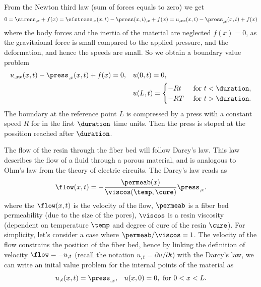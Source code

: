 \documentclass[twoside,a4paper,12pt]{article}
\begin{document}
From the Newton third law (sum of forces equals to zero) we get
%
\begin{align}
  0 =
  \stress_{,x} + f(x) =
  \efstress_{,x}(x,t) - \press(x,t)_{,x} + f(x) =
  u_{,xx}(x,t) - \press_{,x}(x,t) + f(x) 
\end{align}
%
where the body forces and the inertia of the material are neglected
$f(x) = 0$, as the gravitaional force is small compared to the applied
pressure, and the deformation, and hence the speeds are small.
%
So we obtain a boundary value problem
%
\begin{align}
  u_{,xx}(x,t) - \press_{,x}(x,t) + f(x) \label{eq:bvp-flow}
  = 0 , &&& u(0,t) = 0,\\\nonumber
        &&&u(L,t) =
            \begin{cases}
              -Rt &\text{ for } t < \duration,\\
              -RT &\text{ for } t > \duration.
            \end{cases} 
\end{align}
%
The boundary at the reference point $L$ is compressed by a press with
a constant speed $R$ for in the first $\duration$ time units. Then the press
is stoped at the possition reached after $\duration$.

%

The flow of the resin through the fiber bed will follow Darcy's law.
This law describes the flow of a fluid through a porous material, and
is analogous to Ohm's law from the theory of electric circuits. The
Darcy's law reads as
%
\begin{align}
  \flow(x,t) = -\frac{\permeab(x)}{\viscos(\temp,\cure)} \press_{,x}. \label{eq:darcy}
\end{align}
where the $\flow(x,t)$ is the velocity of the flow, $\permeab$ is a fiber bed
permeability (due to the size of the pores),
%
%
$\viscos$ is a resin viscosity (dependent on temperature $\temp$ and
degree of cure of the resin $\cure$).  For simplicity, let's consider
a case where $\permeab/\viscos=1$.
%
The velocity of the flow constrains the position of the fiber bed,
hence by linking the definition of velocity $\flow = - u_{,t}$ (recall the
notation $u_{,t} = \partial u/\partial t$) with the Darcy's law, we
can write an inital value problem for the internal points of the
material as
%
\begin{align}
  u_{,t}(x,t) =  \press_{,x} , && u(x,0) = 0 , \text{ for } 0 < x < L. \label{eq:velocity}
\end{align}
\end{document}
